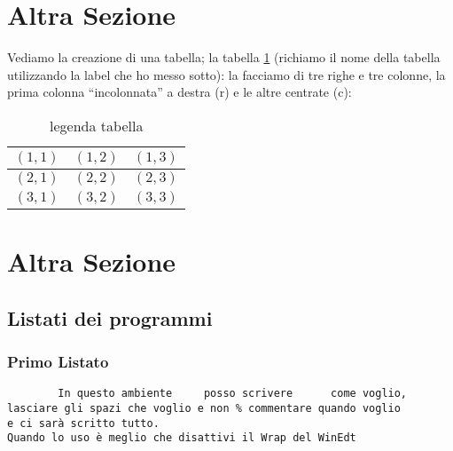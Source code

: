 \documentclass[12pt,a4paper,openright,twoside]{report}
\begin{document}
\section{Altra Sezione}                 %
Vediamo la creazione di una tabella; la tabella \ref{tab:uno}
(richiamo il nome della tabella utilizzando la label che ho messo sotto):
la facciamo di tre righe e tre colonne, la prima colonna
``incolonnata'' a destra (r) e le altre centrate (c):\\
\begin{table}[h]                        %
\begin{center}                          %
\begin{tabular}{r|c|c}                  %
\hline \hline                           %
$(1,1)$ & $(1,2)$ & $(1,3)$\\           %
\hline                                  %
$(2,1)$ & $(2,2)$ & $(2,3)$\\           %
\hline                                  %
$(3,1)$ & $(3,2)$ & $(3,3)$\\
\hline \hline                           %
\end{tabular}
\caption[legenda elenco tabelle]{legenda tabella}\label{tab:uno}
\end{center}
\end{table}
\section{Altra Sezione}\label{sec:prova}%
\subsection{Listati dei programmi}
\subsubsection{Primo Listato}
\begin{verbatim}
        In questo ambiente     posso scrivere      come voglio,
lasciare gli spazi che voglio e non % commentare quando voglio
e ci sarà scritto tutto.
Quando lo uso è meglio che disattivi il Wrap del WinEdt
\end{verbatim}
\clearpage{\pagestyle{empty}\cleardoublepage}
\end{document}
